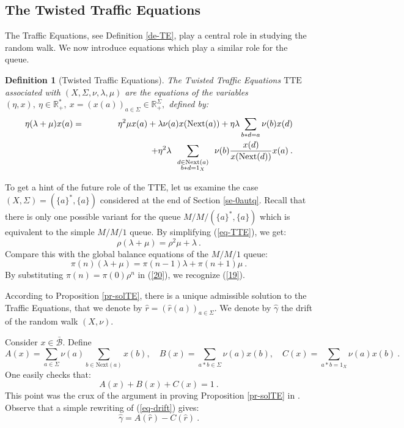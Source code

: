 \documentclass[11pt,a4paper]{article}
\newcommand{\bdl}[2]
{\mbox{$
\renewcommand{\arraystretch}{0.5}
\begin{array}{c}{\scriptstyle #1}\\ {\scriptstyle #2} \end{array}
\renewcommand{\arraystretch}{2}
       $}}
\newtheorem{definition}[theorem]{Definition}
\theoremstyle{remark}
\def\Blackboardfont{\mathbb}
\def\rig{\text{Next}}
\def\lef{\text{Next}}
\def\closcb{\bar{\cB}}
\def\R{{\Blackboardfont R}}
\def\cB{{\mathcal B}}
\def\eref#1{(\ref{#1})}
\begin{document}
\subsection{The Twisted Traffic Equations}

The Traffic Equations, see Definition \ref{de-TE}, play a central role in studying
the random walk.
We now introduce equations which play a similar role
for the queue.


\begin{definition}[Twisted Traffic Equations]\label{de-TTE}
The {\em Twisted Traffic
  Equations $\text{TTE}$} associated with $(X,\Sigma,\nu,\lambda,\mu)$
are the
equations of the variables
$(\eta,x), \ \eta \in \R_+^*, \ x=(x(a))_{a\in \Sigma} \in \R_+^{\Sigma},$
defined by:
\begin{eqnarray}\label{eq-TTE}
\eta (\lambda+\mu) x(a) & = & \eta^2 \mu x(a) + \lambda \nu(a)
x(\rig(a) ) + \eta\lambda \sum_{b \ast d=a} \nu(b)x(d)
\\
& & \hspace*{2.5cm} + \eta^2 \lambda \sum_{\bdl{d\in
\lef(a)}{b\ast d=1_X}} \nu(b) \frac{x(d)}{x(\rig(d))} x(a)
\:.\nonumber
\end{eqnarray}
\end{definition}

To get a hint of the future role of  the $\text{TTE}$,
let us examine the case $(X,\Sigma)=(\{a\}^*,\{a\})$ considered at the
end of Section \ref{se-0autq}. Recall that there is only one possible
variant for the queue $M/M/(\{a\}^*,\{a\})$ which is equivalent to
the simple $M/M/1$ queue.
By simplifying \eref{eq-TTE},
we get:
\begin{equation}\label{19}
    \rho(\lambda+\mu)=\rho^2\mu+\lambda  \:.
    \end{equation}
Compare this with the global balance equations of the $M/M/1$ queue:
\begin{equation}\label{20}
    \pi(n)(\lambda+\mu)=\pi(n-1)\lambda+\pi(n+1)\mu \:.
    \end{equation}
By substituting $\pi(n)=\pi(0)\rho^n$ in (\ref{20}), we recognize
(\ref{19}).

\medskip

According to Proposition \ref{pr-solTE}, there is a unique admissible
solution to the Traffic Equations, that we denote by $\widehat{r}=
(\widehat{r}(a))_{a\in \Sigma}$. We denote by $\widehat{\gamma}$ the
drift of the random walk $(X,\nu)$.

Consider $x\in \closcb$. Define
\begin{equation}\label{eq-ABC}
A(x) = \sum_{a\in \Sigma} \nu(a) \sum_{b\in \rig(a)} x(b), \quad
B(x) = \sum_{a\ast b \in \Sigma} \nu(a)x(b), \quad C(x) =
\sum_{a\ast
  b =1_X} \nu(a)x(b) \:.
\end{equation}
One easily checks that:
\begin{equation}\label{eq-crux}
A(x)+B(x)+C(x)=1\:.
\end{equation}
This point was the crux of
the argument in proving Proposition \ref{pr-solTE} in
\cite{mair04}. Observe that a simple rewriting of \eref{eq-drift} gives:
\begin{equation}\label{eq-gammaAC}
\widehat{\gamma} = A(\widehat{r}) -C(\widehat{r}) \:.
\end{equation}
\end{document}
